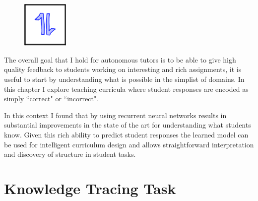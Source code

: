 \begin{figure}[h!]
\includegraphics[width=0.2\textwidth]{img/assnType_1}
\end{figure}

The overall goal that I hold for autonomous tutors is to be able to give high quality feedback to students working on interesting and rich assignments, it is useful to start by understanding what is possible in the simplist of domains. In this chapter I explore teaching curricula where student responses are encoded as simply ``correct" or ``incorrect". 

In this context I found that by using recurrent neural networks results in substantial improvements in the state of the art for understanding what students know. Given this rich ability to predict student responses the learned model can be used for intelligent curriculum design and allows straightforward interpretation and discovery of structure in student tasks. 

\section{Knowledge Tracing Task}


